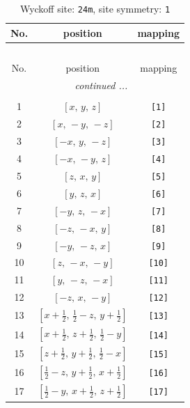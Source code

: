 \documentclass[fleqn,8pt]{jsarticle}
\begin{document}
\begin{longtable}{ccc}
\caption{Wyckoff site: {\tt 24m}, site symmetry: {\tt 1}}
 \\
 \hline \hline
No. & position & mapping \\ \hline \endfirsthead

\multicolumn{2}{l}{\tablename\ \thetable{}} \\
 \hline \hline
No. & position & mapping \\ \hline \endhead

 \hline \hline
\multicolumn{2}{r}{\footnotesize\it continued ...} \\ \endfoot

 \hline \hline
\multicolumn{2}{r}{} \\ \endlastfoot

1 & $\left[ x,\, y,\, z \right]$ & {\tt [1]} \\ \hline
2 & $\left[ x,\, - y,\, - z \right]$ & {\tt [2]} \\ \hline
3 & $\left[ - x,\, y,\, - z \right]$ & {\tt [3]} \\ \hline
4 & $\left[ - x,\, - y,\, z \right]$ & {\tt [4]} \\ \hline
5 & $\left[ z,\, x,\, y \right]$ & {\tt [5]} \\ \hline
6 & $\left[ y,\, z,\, x \right]$ & {\tt [6]} \\ \hline
7 & $\left[ - y,\, z,\, - x \right]$ & {\tt [7]} \\ \hline
8 & $\left[ - z,\, - x,\, y \right]$ & {\tt [8]} \\ \hline
9 & $\left[ - y,\, - z,\, x \right]$ & {\tt [9]} \\ \hline
10 & $\left[ z,\, - x,\, - y \right]$ & {\tt [10]} \\ \hline
11 & $\left[ y,\, - z,\, - x \right]$ & {\tt [11]} \\ \hline
12 & $\left[ - z,\, x,\, - y \right]$ & {\tt [12]} \\ \hline
13 & $\left[ x + \frac{1}{2},\, \frac{1}{2} - z,\, y + \frac{1}{2} \right]$ & {\tt [13]} \\ \hline
14 & $\left[ x + \frac{1}{2},\, z + \frac{1}{2},\, \frac{1}{2} - y \right]$ & {\tt [14]} \\ \hline
15 & $\left[ z + \frac{1}{2},\, y + \frac{1}{2},\, \frac{1}{2} - x \right]$ & {\tt [15]} \\ \hline
16 & $\left[ \frac{1}{2} - z,\, y + \frac{1}{2},\, x + \frac{1}{2} \right]$ & {\tt [16]} \\ \hline
17 & $\left[ \frac{1}{2} - y,\, x + \frac{1}{2},\, z + \frac{1}{2} \right]$ & {\tt [17]} \\ \hline

\end{longtable}
\end{document}
